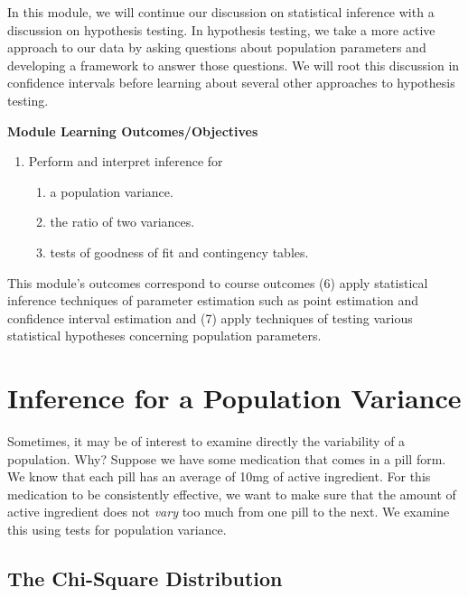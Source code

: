 \documentclass[
]{book}
\providecommand{\tightlist}{%
  \setlength{\itemsep}{0pt}\setlength{\parskip}{0pt}}
\begin{document}
In this module, we will continue our discussion on statistical inference with a discussion on hypothesis testing. In hypothesis testing, we take a more active approach to our data by asking questions about population parameters and developing a framework to answer those questions. We will root this discussion in confidence intervals before learning about several other approaches to hypothesis testing.

\textbf{Module Learning Outcomes/Objectives}

\begin{enumerate}
\def\labelenumi{\arabic{enumi}.}
\tightlist
\item
  Perform and interpret inference for

  \begin{enumerate}
  \def\labelenumii{\alph{enumii}.}
  \tightlist
  \item
    a population variance.
  \item
    the ratio of two variances.
  \item
    tests of goodness of fit and contingency tables.
  \end{enumerate}
\end{enumerate}

This module's outcomes correspond to course outcomes (6) apply statistical inference techniques of parameter estimation such as point estimation and confidence interval estimation and (7) apply techniques of testing various statistical hypotheses concerning population parameters.

\section{Inference for a Population Variance}\label{inference-for-a-population-variance}

Sometimes, it may be of interest to examine directly the variability of a population. Why? Suppose we have some medication that comes in a pill form. We know that each pill has an average of 10mg of active ingredient. For this medication to be consistently effective, we want to make sure that the amount of active ingredient does not \emph{vary} too much from one pill to the next. We examine this using tests for population variance.

\subsection{The Chi-Square Distribution}\label{the-chi-square-distribution}
\end{document}
